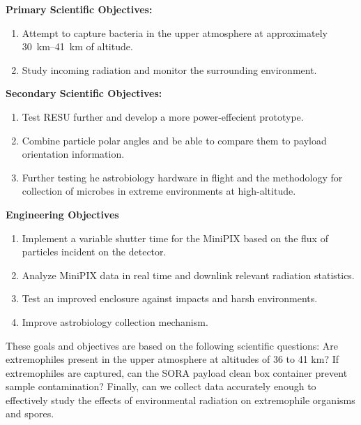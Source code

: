 {\bf Primary Scientific Objectives:}
	\begin{enumerate}
	\item Attempt to capture bacteria in the upper atmosphere at approximately \SIrange{30}{41}{\kilo\meter} of altitude.
	\item Study incoming radiation and monitor the surrounding environment.
	\end{enumerate}
{\bf Secondary Scientific Objectives:}
	\begin{enumerate}
	\item Test RESU further and develop a more power-effecient prototype.
	\item Combine particle polar angles and be able to compare them to payload orientation information.
	\item Further testing he astrobiology hardware in flight and the methodology for collection of microbes in extreme environments at high-altitude.
	\end{enumerate}

{\bf Engineering Objectives}
	\begin{enumerate}
	\item Implement a variable shutter time for the MiniPIX based on the flux of particles incident on the detector.
	\item Analyze MiniPIX data in real time and downlink relevant radiation statistics.
	\item Test an improved enclosure against impacts and harsh environments.
	\item Improve astrobiology collection mechanism.
	\end{enumerate}



These goals and objectives are based on the following scientific questions: Are extremophiles present in the upper atmosphere at altitudes of 36 to 41 km?  If extremophiles are captured, can the SORA payload clean box container prevent sample contamination? Finally, can we collect data accurately enough to effectively study the effects of environmental radiation on extremophile organisms and spores.



